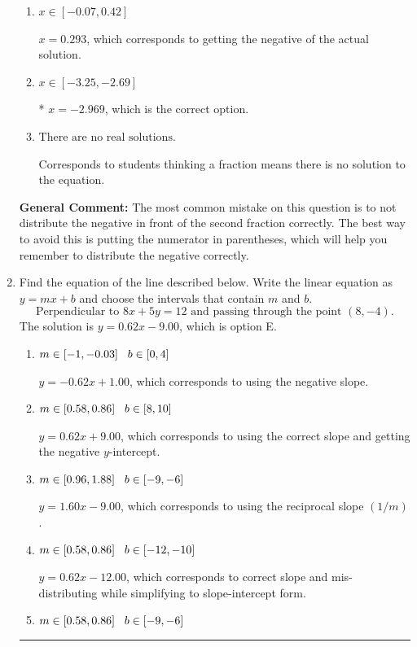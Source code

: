 \documentclass{extbook}[14pt]
\newcommand{\litem}[1]{\item #1

\rule{\textwidth}{0.4pt}}
\begin{document}
\begin{enumerate}
{\begin{enumerate}[label=\Alph*.]
$x = 0.520$, which corresponds to not distributing the negative in front of the first parentheses correctly.
\item \( x \in [-0.07, 0.42] \)

$x = 0.293$, which corresponds to getting the negative of the actual solution.
\item \( x \in [-3.25, -2.69] \)

* $x = -2.969$, which is the correct option.
\item \( \text{There are no real solutions.} \)

Corresponds to students thinking a fraction means there is no solution to the equation.
\end{enumerate}

\textbf{General Comment:} The most common mistake on this question is to not distribute the negative in front of the second fraction correctly. The best way to avoid this is putting the numerator in parentheses, which will help you remember to distribute the negative correctly.
}
\litem{
Find the equation of the line described below. Write the linear equation as $ y=mx+b $ and choose the intervals that contain $m$ and $b$.
\[ \text{Perpendicular to } 8 x + 5 y = 12 \text{ and passing through the point } (8, -4). \]The solution is \( y = 0.62x - 9.00 \), which is option E.\begin{enumerate}[label=\Alph*.]
\item \( m \in [-1, -0.03] \hspace*{3mm} b \in [0, 4] \)

 $y = -0.62x + 1.00$, which corresponds to using the negative slope.
\item \( m \in [0.58, 0.86] \hspace*{3mm} b \in [8, 10] \)

 $y = 0.62x + 9.00$, which corresponds to using the correct slope and getting the negative $y$-intercept.
\item \( m \in [0.96, 1.88] \hspace*{3mm} b \in [-9, -6] \)

 $y = 1.60x - 9.00$, which corresponds to using the reciprocal slope $(1/m)$.
\item \( m \in [0.58, 0.86] \hspace*{3mm} b \in [-12, -10] \)

 $y = 0.62x - 12.00$, which corresponds to correct slope and mis-distributing while simplifying to slope-intercept form.
\item \( m \in [0.58, 0.86] \hspace*{3mm} b \in [-9, -6] \)


\end{enumerate}}
\end{enumerate}
\end{document}

